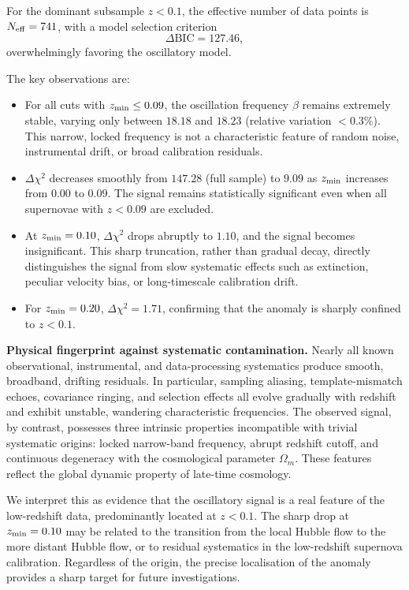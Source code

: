 \documentclass[10pt,a4paper]{article}
\begin{document}
For the dominant subsample $z<0.1$, the effective number of data points is $N_{\rm eff}=741$, with a model selection criterion
\[
\Delta\mathrm{BIC}=127.46,
\]
overwhelmingly favoring the oscillatory model.

The key observations are:
\begin{itemize}
    \item For all cuts with $z_{\rm min}\le0.09$, the oscillation frequency $\beta$ remains extremely stable, varying only between $18.18$ and $18.23$ (relative variation $<0.3\%$). This narrow, locked frequency is not a characteristic feature of random noise, instrumental drift, or broad calibration residuals.
    \item $\Delta\chi^2$ decreases smoothly from $147.28$ (full sample) to $9.09$ as $z_{\rm min}$ increases from $0.00$ to $0.09$. The signal remains statistically significant even when all supernovae with $z<0.09$ are excluded.
    \item At $z_{\rm min}=0.10$, $\Delta\chi^2$ drops abruptly to $1.10$, and the signal becomes insignificant. This sharp truncation, rather than gradual decay, directly distinguishes the signal from slow systematic effects such as extinction, peculiar velocity bias, or long-timescale calibration drift.
    \item For $z_{\rm min}=0.20$, $\Delta\chi^2=1.71$, confirming that the anomaly is sharply confined to $z<0.1$.
\end{itemize}

\noindent
\textbf{Physical fingerprint against systematic contamination.}
Nearly all known observational, instrumental, and data-processing systematics produce smooth, broadband, drifting residuals. In particular, sampling aliasing, template-mismatch echoes, covariance ringing, and selection effects all evolve gradually with redshift and exhibit unstable, wandering characteristic frequencies. The observed signal, by contrast, possesses three intrinsic properties incompatible with trivial systematic origins: locked narrow-band frequency, abrupt redshift cutoff, and continuous degeneracy with the cosmological parameter $\Omega_m$. These features reflect the global dynamic property of late-time cosmology.

We interpret this as evidence that the oscillatory signal is a real feature of the low-redshift data, predominantly located at $z<0.1$. The sharp drop at $z_{\rm min}=0.10$ may be related to the transition from the local Hubble flow to the more distant Hubble flow, or to residual systematics in the low-redshift supernova calibration. Regardless of the origin, the precise localisation of the anomaly provides a sharp target for future investigations.
\end{document}
